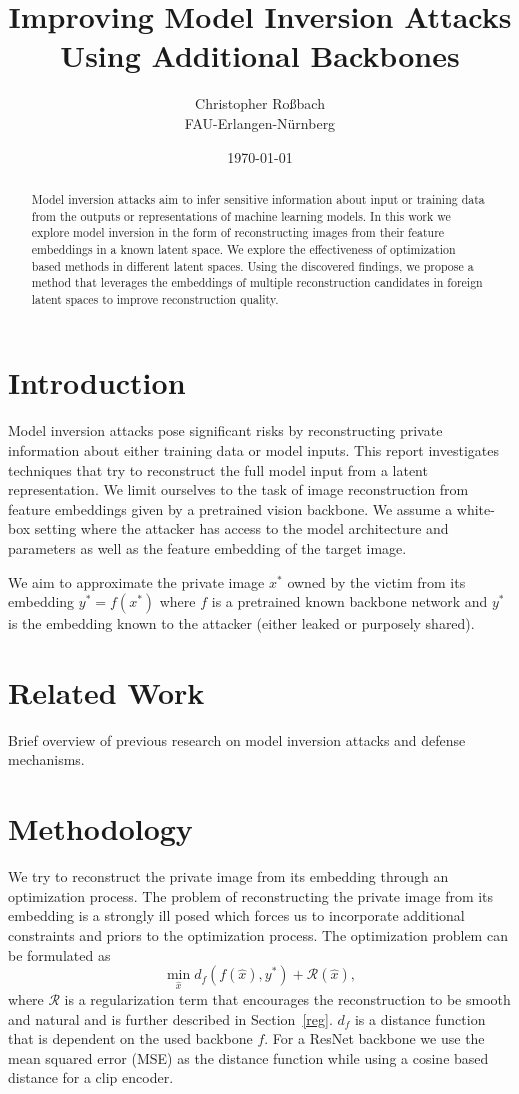 \documentclass[10pt,twocolumn]{article}
\title{Improving Model Inversion Attacks Using Additional Backbones}
\author{Christopher Roßbach \\ FAU-Erlangen-Nürnberg}
\date{\today}
\begin{document}
\maketitle
\begin{abstract}
    Model inversion attacks aim to infer sensitive information about input or training data from the outputs or representations of machine learning models.
    In this work we explore model inversion in the form of reconstructing images from their feature embeddings in a known latent space.
    We explore the effectiveness of optimization based methods in different latent spaces.
    Using the discovered findings, we propose a method that leverages the embeddings of multiple reconstruction candidates in foreign latent spaces to improve reconstruction quality.
\end{abstract}

\section{Introduction}
Model inversion attacks pose significant risks by reconstructing private information about either training data or model inputs.
This report investigates techniques that try to reconstruct the full model input from a latent representation.
We limit ourselves to the task of image reconstruction from feature embeddings given by a pretrained vision backbone.
We assume a white-box setting where the attacker has access to the model architecture and parameters as well as the feature embedding of the target image.

We aim to approximate the private image $x^*$ owned by the victim from its embedding $y^* = f(x^*)$ where $f$ is a pretrained known backbone network and $y^*$ is the embedding known to the attacker (either leaked or purposely shared).

\section{Related Work}
Brief overview of previous research on model inversion attacks and defense mechanisms.


\section{Methodology}
We try to reconstruct the private image from its embedding through an optimization process.
The problem of reconstructing the private image from its embedding is a strongly ill posed which forces us to incorporate additional constraints and priors to the optimization process.
The optimization problem can be formulated as
$$
\min_{\hat{x}} d_f(f(\hat{x}), y^*) + \mathcal{R}(\hat{x}),
$$
where $\mathcal{R}$ is a regularization term that encourages the reconstruction to be smooth and natural and is further described in Section~\ref{reg}.
$d_f$ is a distance function that is dependent on the used backbone $f$.
For a ResNet backbone we use the mean squared error (MSE) as the distance function while using a cosine based distance for a clip encoder.
\end{document}
